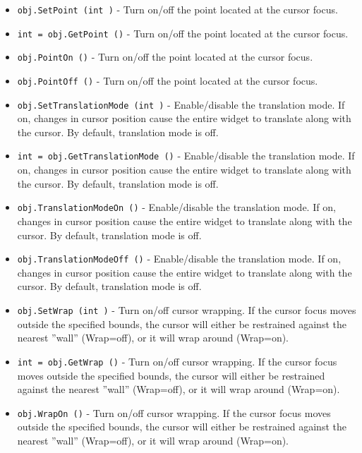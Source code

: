 \begin{itemize}
\item  \verb|obj.SetPoint (int )| -  Turn on/off the point located at the cursor focus.

\item  \verb|int = obj.GetPoint ()| -  Turn on/off the point located at the cursor focus.

\item  \verb|obj.PointOn ()| -  Turn on/off the point located at the cursor focus.

\item  \verb|obj.PointOff ()| -  Turn on/off the point located at the cursor focus.

\item  \verb|obj.SetTranslationMode (int )| -  Enable/disable the translation mode. If on, changes in cursor position
 cause the entire widget to translate along with the cursor.
 By default, translation mode is off.

\item  \verb|int = obj.GetTranslationMode ()| -  Enable/disable the translation mode. If on, changes in cursor position
 cause the entire widget to translate along with the cursor.
 By default, translation mode is off.

\item  \verb|obj.TranslationModeOn ()| -  Enable/disable the translation mode. If on, changes in cursor position
 cause the entire widget to translate along with the cursor.
 By default, translation mode is off.

\item  \verb|obj.TranslationModeOff ()| -  Enable/disable the translation mode. If on, changes in cursor position
 cause the entire widget to translate along with the cursor.
 By default, translation mode is off.

\item  \verb|obj.SetWrap (int )| -  Turn on/off cursor wrapping. If the cursor focus moves outside the
 specified bounds, the cursor will either be restrained against the
 nearest ''wall'' (Wrap=off), or it will wrap around (Wrap=on).

\item  \verb|int = obj.GetWrap ()| -  Turn on/off cursor wrapping. If the cursor focus moves outside the
 specified bounds, the cursor will either be restrained against the
 nearest ''wall'' (Wrap=off), or it will wrap around (Wrap=on).

\item  \verb|obj.WrapOn ()| -  Turn on/off cursor wrapping. If the cursor focus moves outside the
 specified bounds, the cursor will either be restrained against the
 nearest ''wall'' (Wrap=off), or it will wrap around (Wrap=on).


\end{itemize}
